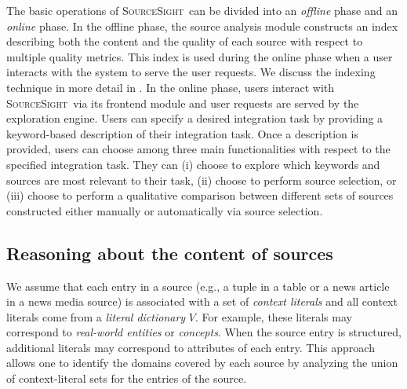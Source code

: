 \documentclass{vldb}
\newcommand\system{\textsc{SourceSight}}
\begin{document}
The basic operations of \system~can be divided into an {\em offline} phase and an {\em online} phase. In the offline phase, the source analysis module constructs an index describing both the content and the quality of each source with respect to multiple quality metrics. This index is used during the online phase when a user interacts with the system to serve the user requests. We discuss the indexing technique in more detail in . In the online phase, users interact with \system~via its frontend module and user requests are served by the exploration engine. Users can specify a desired integration task by providing a keyword-based description of their integration task. Once a description is provided, users can choose among three main functionalities with respect to the specified integration task. They can (i) choose to explore which keywords and sources are most relevant to their task, (ii) choose to perform source selection, or (iii) choose to perform a qualitative comparison between different sets of sources constructed either manually or automatically via source selection. %

\subsection{Reasoning about the content of sources}
\label{sec:reasoning}
We assume that each entry in a source (e.g., a tuple in a table or a news article in a news media source) is associated with a set of {\em context literals} and all context literals come from a {\em literal dictionary} $V$. For example, these literals may correspond to {\em real-world entities} or {\em concepts}. When the source entry is structured, additional literals may correspond to attributes of each entry. This approach allows one to identify the domains covered by each source by analyzing the union of context-literal sets for the entries of the source. 
\end{document}
